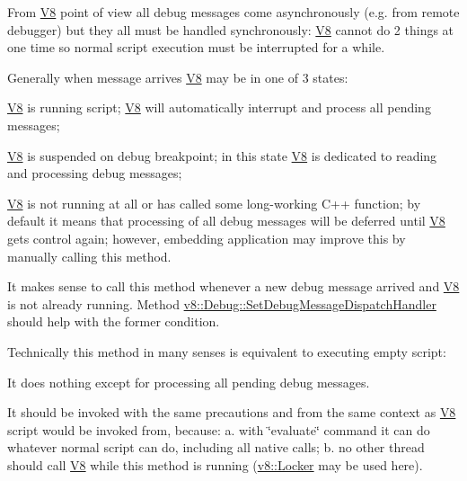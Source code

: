 From \hyperlink{classv8_1_1V8}{V8} point of view all debug messages come asynchronously (e.\-g. from remote debugger) but they all must be handled synchronously\-: \hyperlink{classv8_1_1V8}{V8} cannot do 2 things at one time so normal script execution must be interrupted for a while.

Generally when message arrives \hyperlink{classv8_1_1V8}{V8} may be in one of 3 states\-:
\begin{DoxyEnumerate}
\item \hyperlink{classv8_1_1V8}{V8} is running script; \hyperlink{classv8_1_1V8}{V8} will automatically interrupt and process all pending messages;
\item \hyperlink{classv8_1_1V8}{V8} is suspended on debug breakpoint; in this state \hyperlink{classv8_1_1V8}{V8} is dedicated to reading and processing debug messages;
\item \hyperlink{classv8_1_1V8}{V8} is not running at all or has called some long-\/working C++ function; by default it means that processing of all debug messages will be deferred until \hyperlink{classv8_1_1V8}{V8} gets control again; however, embedding application may improve this by manually calling this method.
\end{DoxyEnumerate}

It makes sense to call this method whenever a new debug message arrived and \hyperlink{classv8_1_1V8}{V8} is not already running. Method \hyperlink{classv8_1_1Debug_a5147f6cfeb9b87a67630b8c959996e9c}{v8\-::\-Debug\-::\-Set\-Debug\-Message\-Dispatch\-Handler} should help with the former condition.

Technically this method in many senses is equivalent to executing empty script\-:
\begin{DoxyEnumerate}
\item It does nothing except for processing all pending debug messages.
\item It should be invoked with the same precautions and from the same context as \hyperlink{classv8_1_1V8}{V8} script would be invoked from, because\-: a. with \char`\"{}evaluate\char`\"{} command it can do whatever normal script can do, including all native calls; b. no other thread should call \hyperlink{classv8_1_1V8}{V8} while this method is running (\hyperlink{classv8_1_1Locker}{v8\-::\-Locker} may be used here).
\end{DoxyEnumerate}

